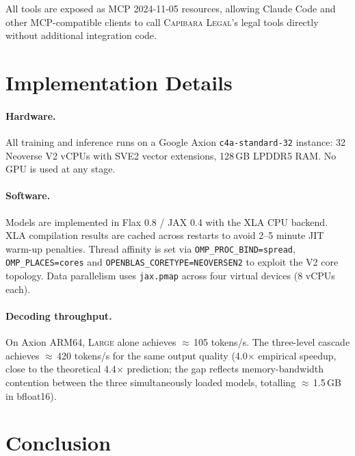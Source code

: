\documentclass[11pt,a4paper]{article}
\newcommand{\modelname}{\textsc{Capibara Legal}}
\begin{document}
All tools are exposed as MCP 2024-11-05 resources, allowing Claude Code and
other MCP-compatible clients to call \modelname{}'s legal tools directly without
additional integration code.

\section{Implementation Details}
\label{sec:impl}

\paragraph{Hardware.}
All training and inference runs on a Google Axion \texttt{c4a-standard-32}
instance: 32 Neoverse V2 vCPUs with SVE2 vector extensions, 128\,GB LPDDR5
RAM. No GPU is used at any stage.

\paragraph{Software.}
Models are implemented in Flax 0.8 / JAX 0.4 with the XLA CPU backend.
XLA compilation results are cached across restarts to avoid 2--5 minute JIT
warm-up penalties. Thread affinity is set via
\texttt{OMP\_PROC\_BIND=spread}, \texttt{OMP\_PLACES=cores} and
\texttt{OPENBLAS\_CORETYPE=NEOVERSEN2} to exploit the V2 core topology.
Data parallelism uses \texttt{jax.pmap} across four virtual devices
(8 vCPUs each).

\paragraph{Decoding throughput.}
On Axion ARM64, \textsc{Large} alone achieves $\approx$\,105 tokens/s.
The three-level cascade achieves $\approx$\,420 tokens/s for the same output
quality (4.0$\times$ empirical speedup, close to the theoretical 4.4$\times$
prediction; the gap reflects memory-bandwidth contention between the three
simultaneously loaded models, totalling $\approx$\,1.5\,GB in bfloat16).

\section{Conclusion}
\end{document}
